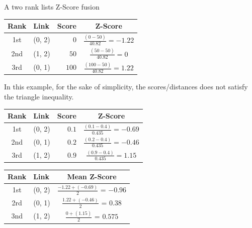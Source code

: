 \begin{example}
  \caption{A two rank lists Z-Score fusion}
  \label{ex:z_score_fusion}

  \begin{subexample}{\linewidth}
    \centering
    \begin{tabular}{c l r c}
      \toprule
      Rank & Link & Score & Z-Score \\
      \midrule
      1st & (0, 2) & $0$ & $\frac{(0-50)}{40.82}=-1.22$ \\
      2nd & (1, 2) & $50$ & $\frac{(50-50)}{40.82}=0$ \\
      3rd & (0, 1) & $100$ & $\frac{(100-50)}{40.82}=1.22$ \\
      \bottomrule
    \end{tabular}
  \end{subexample}

  \vspace{0.5cm}

  In this example, for the sake of simplicity, the scores/distances does not satisfy the triangle inequality.

  \vspace{0.5cm}

  \begin{subexample}{\linewidth}
    \centering
    \begin{tabular}{c l r c}
      \toprule
      Rank & Link & Score & Z-Score \\
      \midrule
      1st & (0, 2) & $0.1$ & $\frac{(0.1-0.4)}{0.435}=-0.69$ \\
      2nd & (0, 1) & $0.2$ & $\frac{(0.2-0.4)}{0.435}=-0.46$ \\
      3rd & (1, 2) & $0.9$ & $\frac{(0.9-0.4)}{0.435}=1.15$ \\
      \bottomrule
    \end{tabular}
  \end{subexample}

  \vspace{0.5cm}

  \begin{subexample}{\linewidth}
    \centering
    \begin{tabular}{c l c}
      \toprule
      Rank & Link & Mean Z-Score \\
      \midrule
      1st & (0, 2) & $\frac{-1.22 + (-0.69)}{2}$ = $-0.96$ \\
      2rd & (0, 1) & $\frac{1.22 + (-0.46)}{2}$ = $0.38$ \\
      3nd & (1, 2) & $\frac{0 + (1.15)}{2}$ = $0.575$ \\
      \bottomrule
    \end{tabular}
  \end{subexample}

\end{example}

